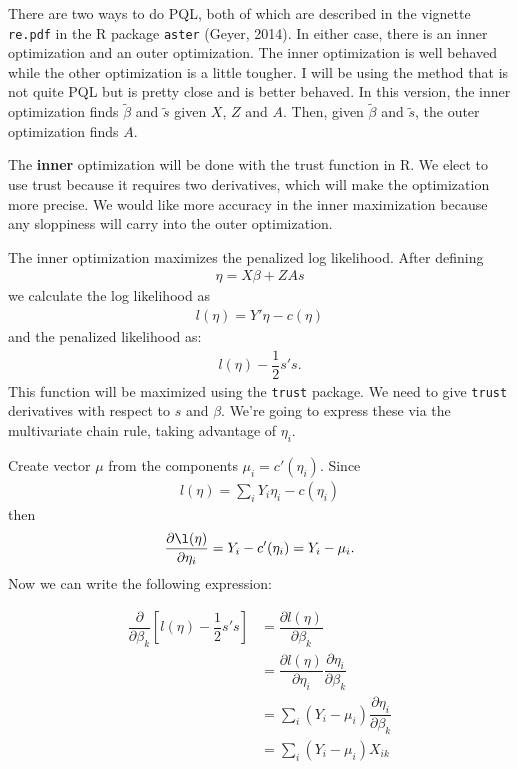 \documentclass{article}
\begin{document}
There are two ways to do PQL, both of which are described in the vignette
 \texttt{re.pdf} in the R package \texttt{aster} (Geyer, 2014). In either case, there is an inner optimization and an outer optimization. The inner optimization is well behaved while the other optimization is a little tougher. I will be using the method that is not quite PQL but is pretty close and is better behaved.  In this version, the inner optimization finds $\tilde{\beta}$ and $\tilde{s}$ given $X$, $Z$ and $A$. Then, given $\tilde{\beta}$ and $\tilde{s}$, the outer optimization finds $A$.




The {\bf inner} optimization will be done with the trust function in R. We elect to use trust because it requires two derivatives, which will make the optimization more precise. We would like more accuracy in the inner maximization because any sloppiness will carry into the outer optimization.

The inner optimization maximizes the penalized log likelihood. After defining
\begin{align}
\eta=X\beta +ZAs
\end{align}
we calculate the  log likelihood as 
\begin{align}
l(\eta)= Y' \eta - c(\eta) 
\end{align}
and the penalized likelihood as:
\begin{align}
 l(\eta)- \dfrac{1}{2} s's.
\end{align}
This function will be maximized using the \texttt{trust} package. We need to give \texttt{trust} derivatives with respect to $s$ and $\beta$. We're going to express these via the multivariate chain rule, taking advantage of $\eta_i$.

Create  vector $\mu$ from the components $\mu_i=c'(\eta_i)$.  Since
\begin{align}
l(\eta) = \sum_i Y_i \eta_i - c(\eta_i)
\end{align}
then 
\begin{align}
\dfrac{\partial \l(\eta)}{\partial \eta_i} = Y_i-c'(\eta_i) = Y_i -\mu_i.
\end{align}
 Now we can write the following expression:

\begin{align}
\dfrac{\partial}{\partial \beta_k} \left[ l(\eta)-\dfrac{1}{2} s's  \right] &= \dfrac{\partial l(\eta)}{\partial \beta_k}    \\
&= \dfrac{\partial l(\eta)}{\partial \eta_i} \dfrac{\partial \eta_i}{\partial \beta_k}    \\
&=\sum_i (Y_i-\mu_i) \dfrac{\partial \eta_i}{\partial \beta_k} \\
&=\sum_i (Y_i-\mu_i) X_{ik}
\end{align}
\end{document}
